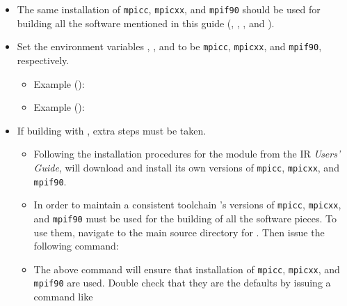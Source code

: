 \begin{itemize}
\item The same installation of \texttt{mpicc}, \texttt{mpicxx}, and \texttt{mpif90} should be used for building all the software mentioned in this guide (\irprogram\!\!, \foam\!\!, \impact\!\!, and ).
\item Set the environment variables , , and  to be \texttt{mpicc}, \texttt{mpicxx}, and \texttt{mpif90}, respectively.
  \begin{itemize}
  \item Example (): \newline
  \item Example (): \newline
  \end{itemize}
\item If building with \foam\!\!, extra steps must be taken. 
  \begin{itemize}
  \item Following the installation procedures for the \foam module from the IR \textit{Users' Guide}, \foam will download and install its own versions of \texttt{mpicc}, \texttt{mpicxx}, and \texttt{mpif90}. 
  \item In order to maintain a consistent toolchain \foam\!\!'s versions of \texttt{mpicc}, \texttt{mpicxx}, and \texttt{mpif90} must be used for the building of all the software pieces. To use them, navigate to the main source directory for \foam\!\!. Then issue the following command:


  \item The above command will ensure that \foam\!\! installation of \texttt{mpicc}, \texttt{mpicxx}, and \texttt{mpif90} are used. Double check that they are the defaults by issuing a command like

  \end{itemize}
\end{itemize}



